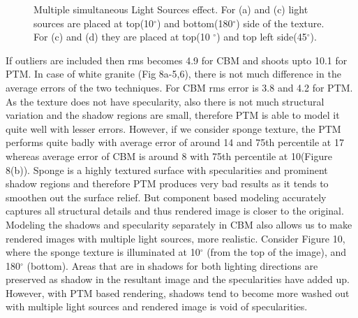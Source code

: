 \begin{figure}[p]
\centering
\caption{Multiple simultaneous Light Sources effect. For (a) and (c) light sources are placed at top(10$^{\circ}$) and bottom(180$^{\circ}$) side 
of the texture. For (c) and (d) they are placed at top(10 $^{\circ}$) and top left side(45$^{\circ}$). }
\end{figure}
If outliers are included then rms becomes 4.9 for CBM and shoots upto 10.1 for PTM.
In case of white granite (Fig 8a-5,6), there is not
much difference in the average errors of the two techniques. For CBM rms error is 3.8 and 4.2 for PTM. As the texture does
not have specularity, also there is not much structural variation and the shadow
regions are small, therefore PTM is able to model it quite well with lesser
errors. However, if we consider sponge texture, the PTM performs quite badly
with average error of around 14 and 75th percentile at 17 whereas average error
of CBM is around 8 with 75th percentile at 10(Figure 8(b)). Sponge is a highly
textured surface with specularities and prominent shadow regions and therefore
PTM produces very bad results as it tends to smoothen out the surface relief.
But component based modeling accurately captures all structural details and thus
rendered image is closer to the original.
Modeling the shadows and specularity separately in CBM also allows us to make rendered images with
multiple light sources, more realistic. Consider Figure 10,
where the sponge texture
is illuminated at 10$^{\circ}$ (from the top of the image), and 180$^{\circ}$
(bottom). Areas that are in shadows for both lighting directions are preserved
as shadow in the resultant image and the specularities have added up. However, with PTM based rendering, shadows tend
to become more washed out with multiple light sources and rendered image is void of specularities.

